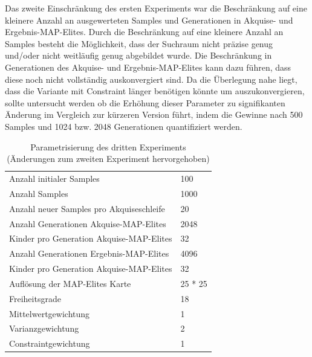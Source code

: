 Das zweite Einschränkung des ersten Experiments war die Beschränkung auf eine kleinere Anzahl an ausgewerteten Samples und Generationen in Akquise- und Ergebnis-MAP-Elites.
Durch die Beschränkung auf eine kleinere Anzahl an Samples besteht die Möglichkeit, dass der Suchraum nicht präzise genug und/oder nicht weitläufig genug abgebildet wurde.
Die Beschränkung in Generationen des Akquise- und Ergebnis-MAP-Elites kann dazu führen, dass diese noch nicht vollständig auskonvergiert sind.
Da die Überlegung nahe liegt, dass die Variante mit Constraint länger benötigen könnte um auszukonvergieren, sollte untersucht werden ob die Erhöhung dieser Parameter zu signifikanten Änderung im Vergleich zur kürzeren Version führt, indem die Gewinne nach 500 Samples und 1024 bzw. 2048 Generationen quantifiziert werden.

\begin{table}[h]
	\centering
	\begin{tabularx}{.75\textwidth}{ll}\hline
		Anzahl initialer Samples & 100 \\
		Anzahl Samples & 1000 \\
		Anzahl neuer Samples pro Akquiseschleife & 20 \\
		Anzahl Generationen Akquise-MAP-Elites & 2048 \\
		Kinder pro Generation Akquise-MAP-Elites & 32 \\
		Anzahl Generationen Ergebnis-MAP-Elites & 4096 \\
		Kinder pro Generation Akquise-MAP-Elites & 32 \\
		Auflösung der MAP-Elites Karte & 25 * 25  \\
		\hline
		Freiheitsgrade & 18 \\
		Mittelwertgewichtung & 1 \\
		Varianzgewichtung & 2 \\
		Constraintgewichtung & 1 \\
	\end{tabularx}
	\label{tab:params3rd}
	\caption{Parametrisierung des dritten Experiments (Änderungen zum zweiten Experiment hervorgehoben)}
\end{table}

